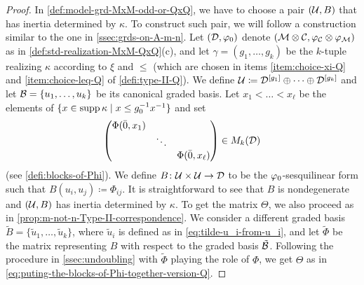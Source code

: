 \begin{proof}
    In \cref{def:model-grd-MxM-odd-or-QxQ}, we have to choose a pair $(\mathcal U, B)$ that has inertia determined by $\kappa$. 
    To construct such pair, we will follow a construction similar to the one in \cref{ssec:grds-on-A-m-n}. 
    Let $(\mathcal{D}, \varphi_0)$ denote $(\mathcal M \otimes \mathcal C, \varphi_{\mathcal C} \otimes \varphi_{\mathcal M})$ as in \cref{def:std-realization-MxM-QxQ}(c), and let $\gamma = (g_1, \ldots, g_k)$ be the $k$-tuple realizing $\kappa$ according to $\xi$ and $\leq$ (which are chosen in items \eqref{item:choice-xi-Q} and \eqref{item:choice-leq-Q} of \cref{defi:type-II-Q}). 
    We define $\mathcal U \coloneqq \mathcal{D}^{[g_1]}\oplus \cdots \oplus \mathcal{D}^{[g_k]}$ and let $\mathcal B = \{ u_1, \ldots, u_k\}$ be its canonical graded basis. 
    Let $x_1 < \ldots < x_{\ell}$ be the elements of $\{ x \in \operatorname{supp} \kappa \mid x \leq g_0^{-1} x^{-1} \}$ and set 
    \[
        \begin{pmatrix}
        \Phi(\bar 0, x_1)&& \\
        & \ddots &\\
        && \Phi(\bar 0, x_{\ell})
    \end{pmatrix} \in M_k(\mathcal{D})
    \]
    (see \cref{defi:blocks-of-Phi}). 
    We define $B\colon \mathcal U \times \mathcal U \to \mathcal{D}$ to be the $\varphi_0$-sesquilinear form such that $B(u_i, u_j) \coloneqq \Phi_{ij}$. 
    It is straightforward to see that $B$ is nondegenerate and $(\mathcal U, B)$ has inertia determined by $\kappa$. 
    To get the matrix $\Theta$, we also proceed as in \cref{prop:m-not-n-Type-II-correspondence}. 
    We consider a different graded basis $\tilde B = \{ \tilde u_1, \ldots, \tilde u_k \}$, where $\tilde u_i$ is defined as in \cref{eq:tilde-u_i-from-u_i}, and let $\tilde \Phi$ be the matrix representing $B$ with respect to the graded basis $\tilde {\mathcal B}$. 
    Following the procedure in \cref{ssec:undoubling} with $\tilde \Phi$ playing the role of $\Phi$, we get  $\Theta$ as in \cref{eq:puting-the-blocks-of-Phi-together-version-Q}.

\end{proof}
